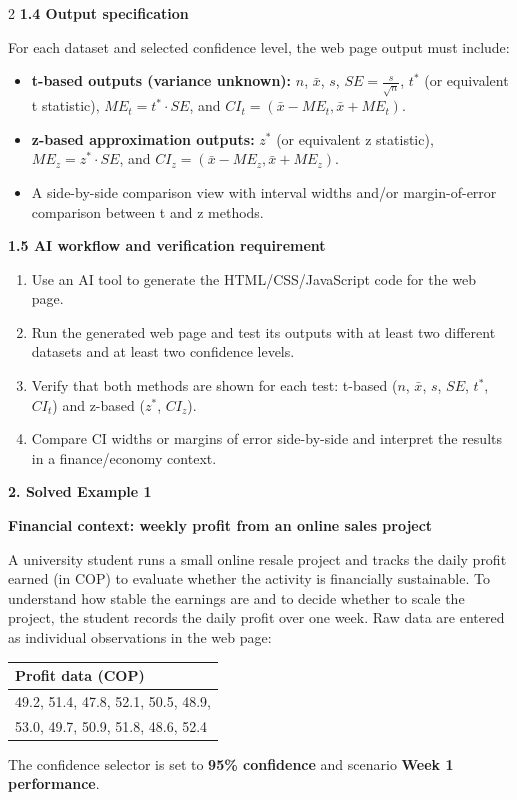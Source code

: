 \documentclass[12pt]{article}
\newcommand{\SubsectionBox}[1]{%
	\noindent\colorbox{gray!30}{%
		\parbox{\linewidth}{\textbf{#1}}%
	}\par\vspace{0.35cm}%
}
\begin{document}
\begin{multicols}{2}
		\textbf{1.4 Output specification}\par
		For each dataset and selected confidence level, the web page output must include:
		\begin{itemize}
			\item \textbf{t-based outputs (variance unknown):} $n$, $\bar{x}$, $s$, $SE=\frac{s}{\sqrt{n}}$, $t^*$ (or equivalent t statistic), $ME_t=t^*\cdot SE$, and $CI_t=(\bar{x}-ME_t,\bar{x}+ME_t)$.
			\item \textbf{z-based approximation outputs:} $z^*$ (or equivalent z statistic), $ME_z=z^*\cdot SE$, and $CI_z=(\bar{x}-ME_z,\bar{x}+ME_z)$.
			\item A side-by-side comparison view with interval widths and/or margin-of-error comparison between t and z methods.
		\end{itemize}
		
		\textbf{1.5 AI workflow and verification requirement}\par
		\begin{enumerate}
			\item Use an AI tool to generate the HTML/CSS/JavaScript code for the web page.
			\item Run the generated web page and test its outputs with at least two different datasets and at least two confidence levels.
			\item Verify that both methods are shown for each test: t-based ($n$, $\bar{x}$, $s$, $SE$, $t^*$, $CI_t$) and z-based ($z^*$, $CI_z$).
			\item Compare CI widths or margins of error side-by-side and interpret the results in a finance/economy context.
		\end{enumerate}
		
		\newpage
		\SubsectionBox{2. Solved Example 1}
		
		\textbf{Financial context: weekly profit from an online sales project}\par
		A university student runs a small online resale project and tracks the daily profit earned (in COP) to evaluate whether the activity is financially sustainable. To understand how stable the earnings are and to decide whether to scale the project, the student records the daily profit over one week. Raw data are entered as individual observations in the web page:
		
		\begin{center}
			\begin{tabular}{l}
				\hline
				Profit data (COP) \\
				\hline
				49.2, 51.4, 47.8, 52.1, 50.5, 48.9,\\
				53.0, 49.7, 50.9, 51.8, 48.6, 52.4 \\
				\hline
			\end{tabular}
		\end{center}
		The confidence selector is set to \textbf{95\% confidence} and scenario \textbf{Week 1 performance}.
		

\end{multicols}
\end{document}
